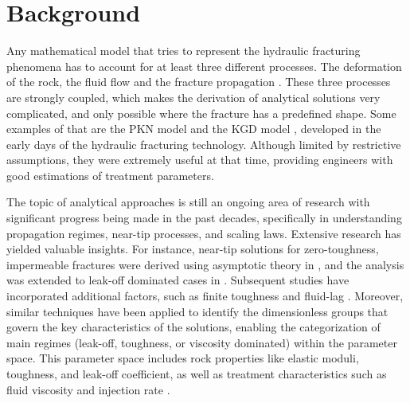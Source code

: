 \section{Background}







    Any mathematical model that tries to represent the hydraulic fracturing phenomena has to account for at least three different processes. The deformation of the rock, the fluid flow and the fracture propagation \cite{adachi2007computer}. These three processes are strongly coupled, which makes the derivation of analytical solutions very complicated, and only possible where the fracture has a predefined shape. Some examples of that are the PKN model \cite{perkins1961widths, sneddon1946opening, nordgren1972propagation} and the KGD model \cite{zheltov19553, geertsma1969rapid}, developed in the early days of the hydraulic fracturing technology. Although limited by restrictive assumptions, they were extremely useful at that time, providing engineers with good estimations of treatment parameters.


    The topic of analytical approaches is still an ongoing area of research with significant progress being made in the past decades, specifically in understanding propagation regimes, near-tip processes, and scaling laws. Extensive research has yielded valuable insights. For instance, near-tip solutions for zero-toughness, impermeable fractures were derived using asymptotic theory in \cite{desroches1994crack}, and the analysis was extended to leak-off dominated cases in \cite{lenoach1995crack}. Subsequent studies have incorporated additional factors, such as finite toughness and fluid-lag \cite{detournay2002asymptotic, detournay2003near, garagash2000tip}. Moreover, similar techniques have been applied to identify the dimensionless groups that govern the key characteristics of the solutions, enabling the categorization of main regimes (leak-off, toughness, or viscosity dominated) within the parameter space. This parameter space includes rock properties like elastic moduli, toughness, and leak-off coefficient, as well as treatment characteristics such as fluid viscosity and injection rate \cite{detournay2004propagation, adachi2002self, carbonell1999comparison, savitski2002propagation, garagash2005plane}.

